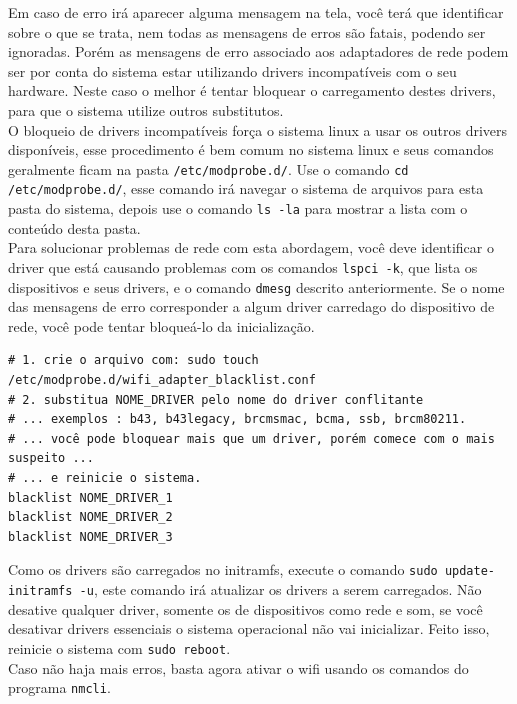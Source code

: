 \documentclass[12pt,a4paper]{article}
\begin{document}
Em caso de erro irá aparecer alguma mensagem na tela, você terá que identificar sobre o que se trata, nem todas as mensagens de erros são fatais, podendo ser ignoradas. Porém as mensagens de erro associado aos adaptadores de rede podem ser por conta do sistema estar utilizando drivers incompatíveis com o seu hardware. Neste caso o melhor é tentar bloquear o carregamento destes drivers, para que o sistema utilize outros substitutos. \\

O bloqueio de drivers incompatíveis força o sistema linux a usar os outros drivers disponíveis, esse procedimento é bem comum no sistema linux e seus comandos geralmente ficam na pasta \texttt{/etc/modprobe.d/}. Use o comando \texttt{cd /etc/modprobe.d/}, esse comando irá navegar o sistema de arquivos para esta pasta do sistema, depois use o comando \texttt{ls -la} para mostrar a lista com o conteúdo desta pasta. \\

Para solucionar problemas de rede com esta abordagem, você deve identificar o driver que está causando problemas com os comandos \texttt{lspci -k}, que lista os dispositivos e seus drivers, e o comando \texttt{dmesg} descrito anteriormente. Se o nome das mensagens de erro corresponder a algum driver carredago do dispositivo de rede, você pode tentar bloqueá-lo da inicialização. \\

\begin{lstlisting}
# 1. crie o arquivo com: sudo touch /etc/modprobe.d/wifi_adapter_blacklist.conf 
# 2. substitua NOME_DRIVER pelo nome do driver conflitante 
# ... exemplos : b43, b43legacy, brcmsmac, bcma, ssb, brcm80211.
# ... você pode bloquear mais que um driver, porém comece com o mais suspeito ...
# ... e reinicie o sistema.
blacklist NOME_DRIVER_1
blacklist NOME_DRIVER_2
blacklist NOME_DRIVER_3
\end{lstlisting}

\vspace{\baselineskip}

Como os drivers são carregados no initramfs, execute o comando \texttt{sudo update-initramfs -u}, este comando irá atualizar os drivers a serem carregados. Não desative qualquer driver, somente os de dispositivos como rede e som, se você desativar drivers essenciais o sistema operacional não vai inicializar. Feito isso, reinicie o sistema com \texttt{sudo reboot}.\\

Caso não haja mais erros, basta agora ativar o wifi usando os comandos do programa \texttt{nmcli}. \\
\end{document}
